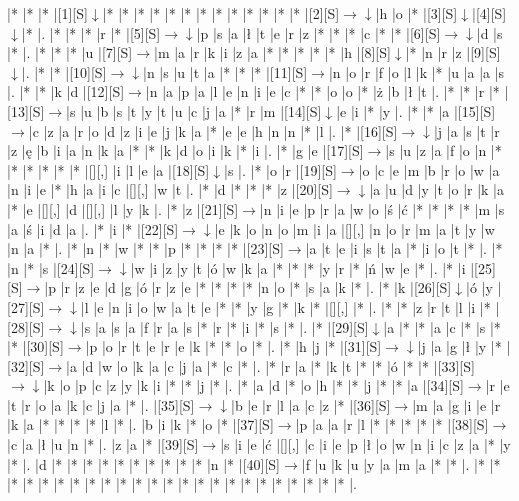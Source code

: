 \documentclass[11pt]{article}
\newcommand\drarr{$\rightarrow \!\!\!\!\! \downarrow$}
\newcommand\rarr{$\rightarrow$}
\newcommand\darr{$\downarrow$}
\begin{document}
\noindent\begin{Puzzle}{23}{26}|*	|*	|*	|[1][S]\darr	|*	|*	|*	|*	|*	|*	|*	|*	|*	|*	|*	|*	|*	|[2][S]\drarr	|h	|o	|*	|[3][S]\darr	|[4][S]\darr	|*	|.
|*	|*	|*	|r	|*	|[5][S]\drarr	|p	|s	|a	|ł	|t	|e	|r	|z	|*	|*	|*	|c	|*	|*	|[6][S]\drarr	|d	|s	|*	|.
|*	|*	|*	|u	|[7][S]\rarr	|m	|a	|r	|k	|i	|z	|a	|*	|*	|*	|*	|*	|h	|[8][S]\darr	|*	|n	|r	|z	|[9][S]\darr	|.
|*	|*	|[10][S]\drarr	|n	|s	|u	|t	|a	|*	|*	|*	|[11][S]\rarr	|n	|o	|r	|f	|o	|l	|k	|*	|u	|a	|a	|s	|.
|*	|*	|k	|d	|[12][S]\rarr	|n	|a	|p	|a	|l	|e	|n	|i	|e	|c	|*	|*	|o	|o	|*	|ż	|b	|ł	|t	|.
|*	|*	|r	|*	|[13][S]\rarr	|s	|u	|b	|s	|t	|y	|t	|u	|c	|j	|a	|*	|r	|m	|[14][S]\darr	|e	|i	|*	|y	|.
|*	|*	|a	|[15][S]\rarr	|c	|z	|a	|r	|o	|d	|z	|i	|e	|j	|k	|a	|*	|e	|e	|h	|n	|n	|*	|l	|.
|*	|[16][S]\drarr	|j	|a	|s	|t	|r	|z	|ę	|b	|i	|a	|n	|k	|a	|*	|*	|k	|d	|o	|i	|k	|*	|i	|.
|*	|g	|e	|[17][S]\rarr	|s	|u	|z	|a	|f	|o	|n	|*	|*	|*	|*	|*	|*	|[][,]{ }	|i	|l	|e	|a	|[18][S]\darr	|s	|.
|*	|o	|r	|[19][S]\rarr	|o	|c	|e	|m	|b	|r	|o	|w	|a	|n	|i	|e	|*	|h	|a	|i	|c	|[][,]{ }	|w	|t	|.
|*	|d	|*	|*	|*	|z	|[20][S]\drarr	|a	|u	|d	|y	|t	|o	|r	|k	|a	|*	|e	|[][,]{ }	|d	|[][,]{ }	|l	|y	|k	|.
|*	|z	|[21][S]\rarr	|n	|i	|e	|p	|r	|a	|w	|o	|ś	|ć	|*	|*	|*	|*	|m	|s	|a	|ś	|i	|d	|a	|.
|*	|i	|*	|[22][S]\drarr	|e	|k	|o	|n	|o	|m	|i	|a	|[][,]{ }	|n	|o	|r	|m	|a	|t	|y	|w	|n	|a	|*	|.
|*	|n	|*	|w	|*	|*	|p	|*	|*	|*	|*	|[23][S]\rarr	|a	|t	|e	|i	|s	|t	|a	|*	|i	|o	|t	|*	|.
|*	|n	|*	|s	|[24][S]\drarr	|w	|i	|z	|y	|t	|ó	|w	|k	|a	|*	|*	|*	|y	|r	|*	|ń	|w	|e	|*	|.
|*	|i	|[25][S]\rarr	|p	|r	|z	|e	|d	|g	|ó	|r	|z	|e	|*	|*	|*	|*	|n	|o	|*	|s	|a	|k	|*	|.
|*	|k	|[26][S]\darr	|ó	|y	|[27][S]\drarr	|l	|e	|n	|i	|o	|w	|a	|t	|e	|*	|*	|y	|g	|*	|k	|*	|[][,]{ }	|*	|.
|*	|*	|z	|r	|t	|l	|i	|*	|[28][S]\drarr	|s	|a	|s	|a	|f	|r	|a	|s	|*	|r	|*	|i	|*	|s	|*	|.
|*	|[29][S]\darr	|a	|*	|*	|a	|c	|*	|s	|*	|*	|[30][S]\rarr	|p	|o	|r	|t	|e	|r	|e	|k	|*	|*	|o	|*	|.
|*	|h	|j	|*	|[31][S]\drarr	|j	|a	|g	|ł	|y	|*	|[32][S]\rarr	|a	|d	|w	|o	|k	|a	|c	|j	|a	|*	|c	|*	|.
|*	|r	|a	|*	|k	|t	|*	|*	|ó	|*	|*	|[33][S]\drarr	|k	|o	|p	|c	|z	|y	|k	|i	|*	|*	|j	|*	|.
|*	|a	|d	|*	|o	|h	|*	|*	|j	|*	|*	|a	|[34][S]\rarr	|r	|e	|t	|r	|o	|a	|k	|c	|j	|a	|*	|.
|[35][S]\drarr	|b	|e	|r	|l	|a	|c	|z	|*	|[36][S]\rarr	|m	|a	|g	|i	|e	|r	|k	|a	|*	|*	|*	|*	|l	|*	|.
|b	|i	|k	|*	|o	|*	|[37][S]\rarr	|p	|a	|a	|r	|l	|*	|*	|*	|*	|*	|[38][S]\rarr	|c	|a	|ł	|u	|n	|*	|.
|z	|a	|*	|[39][S]\rarr	|s	|i	|e	|ć	|[][,]{ }	|c	|i	|e	|p	|ł	|o	|w	|n	|i	|c	|z	|a	|*	|y	|*	|.
|d	|*	|*	|*	|*	|*	|*	|*	|*	|*	|*	|n	|*	|[40][S]\rarr	|f	|u	|k	|u	|y	|a	|m	|a	|*	|*	|.
|*	|*	|*	|*	|*	|*	|*	|*	|*	|*	|*	|*	|*	|*	|*	|*	|*	|*	|*	|*	|*	|*	|*	|*	|.\end{Puzzle}
\end{document}

